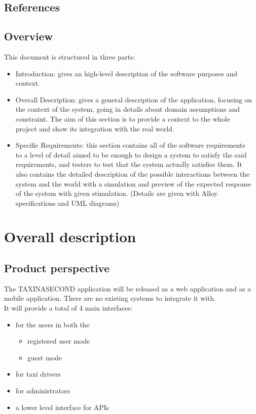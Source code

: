 \documentclass{article}
\begin{document}
	\subsection{References}

	\subsection{Overview}
	This document is structured in three parts:
	\begin{itemize}
		\item Introduction: gives an high-level description of the software purposes and context.
		\item Overall Description: gives a general description of the application, focusing on the context of the system, going in details about domain assumptions and constraint. The aim of this section is to provide a context to the whole project and show its integration with the real world.
		\item Specific Requirements: this section contains all of the software requirements to a level of detail aimed to be enough to design a system to satisfy the said requirements, and testers to test that the system actually satisfies them. It also contains the detailed description of the possible interactions between the system and the world with a simulation and preview of the expected response of the system with given stimulation. (Details are given with Alloy specifications and UML diagrams)
	\end{itemize}


	\section{Overall description}
	\subsection{Product perspective}
	The TAXINASECOND application will be released as a web application and as a mobile application. 
	There are no existing systems to integrate it with. 
	\\It will provide a total of 4 main interfaces:
	\begin{itemize}
		\item for the users in both the
			\begin{itemize}
				\item registered user mode
				\item guest mode
			\end{itemize}
		\item for taxi drivers 
		\item for administrators
		\item a lower level interface for APIs
	\end{itemize}
\end{document}
